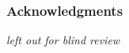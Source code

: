 \documentclass{article}
\begin{document}

\subsubsection*{Acknowledgments}

{\em left out for blind review}






\end{document}
